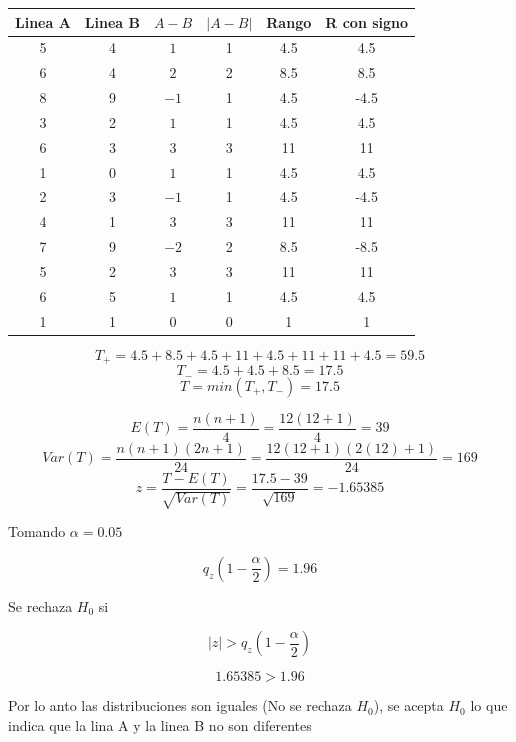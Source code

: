 \documentclass{article}
\begin{document}
\begin{center}
    \begin{tabular}{c c c c c c}
        Linea A & Linea B & $ A - B $ & $| A - B |$ & Rango & R con signo \\
        \hline
        5       & 4       & $1$       & 1           & 4.5   & 4.5         \\
        6       & 4       & $2$       & 2           & 8.5   & 8.5         \\
        8       & 9       & $-1$      & 1           & 4.5   & -4.5        \\
        3       & 2       & $1$       & 1           & 4.5   & 4.5         \\
        6       & 3       & $3$       & 3           & 11    & 11          \\
        1       & 0       & $1$       & 1           & 4.5   & 4.5         \\
        2       & 3       & $-1$      & 1           & 4.5   & -4.5        \\
        4       & 1       & $3$       & 3           & 11    & 11          \\
        7       & 9       & $-2$      & 2           & 8.5   & -8.5        \\
        5       & 2       & $3$       & 3           & 11    & 11          \\
        6       & 5       & $1$       & 1           & 4.5   & 4.5         \\
        1       & 1       & $0$       & 0           & 1     & 1           \\
    \end{tabular}
\end{center}

\[T_{+} = 4.5+8.5+4.5+11+4.5+11+11+4.5 = 59.5\]
\[T_{-} = 4.5+4.5+8.5 = 17.5\]
\[T = min(T_{+}, T_{-}) = 17.5\]

\[
    E(T) = \frac{n(n + 1)}{4} = \frac{12(12 + 1)}{4} = 39
\]
\[
    Var(T) = \frac{n(n + 1)(2n + 1)}{24} = \frac{12(12 + 1)(2(12) + 1)}{24} =169
\]
\[
    z = \frac{T - E(T)}{\sqrt{Var(T)}} = \frac{17.5 - 39}{\sqrt{169}} = -1.65385
\]

Tomando $\alpha = 0.05$

\[q_z(1 - \frac{\alpha}{2}) = 1.96\]

Se rechaza $H_0$ si

\[|z| > q_z(1-\frac{\alpha}{2})\]

\[1.65385 > 1.96\]

Por lo anto las distribuciones son iguales (No se rechaza $H_0$), se acepta $H_0$ lo que indica que la lina A y la linea B no son diferentes
\end{document}
